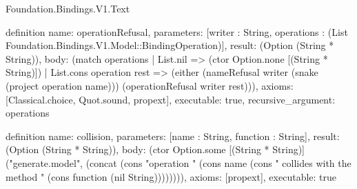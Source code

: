 \begin{lexlean}{Foundation.Bindings.V1.Text}
\begin{semanticmodule}
definition{
  name: operationRefusal,
  parameters: [writer : String, operations : (List Foundation.Bindings.V1.Model::BindingOperation)],
  result: (Option (String * String)),
  body: (match operations
    | List.nil => (ctor Option.none [(String * String)])
    | List.cons operation rest => (either (nameRefusal writer (snake (project operation name))) (operationRefusal writer rest))),
  axioms: [Classical.choice, Quot.sound, propext],
  executable: true,
  recursive_argument: operations
}

definition{
  name: collision,
  parameters: [name : String, function : String],
  result: (Option (String * String)),
  body: (ctor Option.some [(String * String)] ("generate.model", (concat (cons "operation " (cons name (cons " collides with the method " (cons function (nil String)))))))),
  axioms: [propext],
  executable: true
}
\end{semanticmodule}
\end{lexlean}
